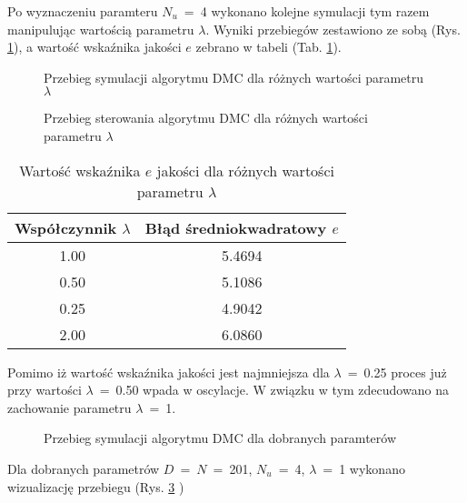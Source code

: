 Po wyznaczeniu paramteru $N_u$~=~4 wykonano kolejne symulacji tym razem manipulując wartością parametru $\lambda$. Wyniki przebiegów zestawiono ze sobą (Rys. \ref{lambda}), a wartość wskaźnika jakości $e$ zebrano w tabeli (Tab. \ref{elambda}).

\begin{figure}
	
	\centering
	\caption{ Przebieg symulacji algorytmu DMC dla różnych wartości  parametru $\lambda$ }
	
	\label{lambda}
\end{figure}

\begin{figure}
	
	\centering
	\caption{ Przebieg sterowania algorytmu DMC dla różnych wartości  parametru $\lambda$ }
	
	\label{Ulambda}
\end{figure}

\begin{table}
	[b] \caption{Wartość wskaźnika $e$ jakości dla różnych wartości parametru $\lambda$}
	\label{elambda}
	\centering
	\begin{small}
		\begin{tabular}{|c|c|}
			\hline 
			Współczynnik $\lambda$ & Błąd średniokwadratowy $e$ \\ 
			\hline 
			\num{1.00} & \num{5.4694} \\ 
			\hline 
			\num{0.50} & \num{5.1086} \\ 
			\hline 
			\num{ 0.25} & \num{4.9042} \\ 
			\hline 
			\num{2.00} &  \num{6.0860} \\ 
			\hline 
		\end{tabular} 
	\end{small}
\end{table}

Pomimo iż wartość wskaźnika jakości jest najmniejsza dla $\lambda$~=~\num{0.25} proces już przy wartości $\lambda$~=~\num{0.50} wpada w oscylacje. W związku w tym zdecudowano na zachowanie parametru $\lambda$~=~1.

\begin{figure}
	
	\centering
	\caption{ Przebieg symulacji algorytmu DMC dla dobranych paramterów }
	
	\label{run}
\end{figure}

Dla dobranych parametrów $D$~=~$N$~=~201, $N_u$~=~4, $\lambda$~=~\num{1} wykonano wizualizację przebiegu (Rys. \ref{run} )

